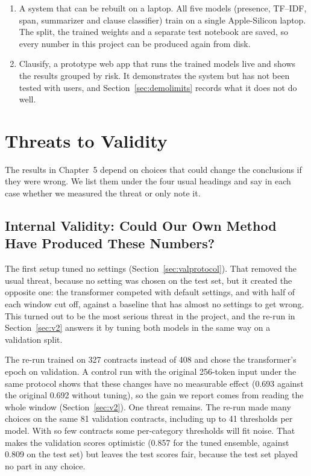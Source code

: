 \begin{enumerate}[itemsep=2pt]
  \item A system that can be rebuilt on a laptop. All five models (presence, TF--IDF, span, summarizer and clause classifier) train on a single Apple-Silicon laptop. The split, the trained weights and a separate test notebook are saved, so every number in this project can be produced again from disk.
  \item Clausify, a prototype web app that runs the trained models live and shows the results grouped by risk. It demonstrates the system but has not been tested with users, and Section~\ref{sec:demolimits} records what it does not do well.
\end{enumerate}

\section{Threats to Validity}
\label{sec:threats}
The results in Chapter~5 depend on choices that could change the conclusions if they were wrong. We list them under the four usual headings and say in each case whether we measured the threat or only note it.

\subsection{Internal Validity: Could Our Own Method Have Produced These Numbers?}
The first setup tuned no settings (Section~\ref{sec:valprotocol}). That removed the usual threat, because no setting was chosen on the test set, but it created the opposite one: the transformer competed with default settings, and with half of each window cut off, against a baseline that has almost no settings to get wrong. This turned out to be the most serious threat in the project, and the re-run in Section~\ref{sec:v2} answers it by tuning both models in the same way on a validation split.

The re-run trained on 327 contracts instead of 408 and chose the transformer's epoch on validation. A control run with the original 256-token input under the same protocol shows that these changes have no measurable effect (0.693 against the original 0.692 without tuning), so the gain we report comes from reading the whole window (Section~\ref{sec:v2}). One threat remains. The re-run made many choices on the same 81 validation contracts, including up to 41 thresholds per model. With so few contracts some per-category thresholds will fit noise. That makes the validation scores optimistic (0.857 for the tuned ensemble, against 0.809 on the test set) but leaves the test scores fair, because the test set played no part in any choice.


